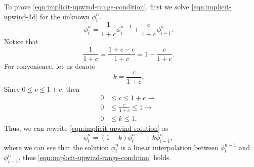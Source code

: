 \documentclass[../thesis.tex]{subfiles}
\begin{document}
To prove \eqref{eqn:implicit-upwind-range-condition}, first we solve \eqref{eqn:implicit-upwind-1d} for the unknown \(\phi_{i}^{n}\).
\begin{equation}\label{eqn:implicit-upwind-solution}
    \phi_{i}^{n} =
    \frac{1}{1+c}\phi_{i}^{n-1} + \frac{c}{1+c}\phi_{i-1}^{n}.
\end{equation}
Notice that
\[
    \frac{1}{1+c} = \frac{1+c-c}{1+c} = 1 - \frac{c}{1+c}.
\]
For convenience, let us denote
\begin{equation}\label{eqn:implicit-upwind-coefficient}
    k = \frac{c}{1+c}.
\end{equation}
Since \(0 \leq c \leq 1+c\), then
\begin{equation}
    \begin{split}
        0 &\leq c \leq 1+c \rightarrow\\
        0 &\leq \frac{c}{1+c} \leq 1 \rightarrow\\
        0 &\leq k \leq 1.
    \end{split}
\end{equation}
Thus, we can rewrite \eqref{eqn:implicit-upwind-solution} as
\begin{equation}\label{eqn:implicit-uwpind-linear-interpolation}
    \phi_{i}^{n} =
    (1-k)\phi_{i}^{n-1} + k\phi_{i-1}^{n},
\end{equation}
where we can see that the solution \(\phi_{i}^{n}\) is a linear interpolation
between \(\phi_{i}^{n-1}\) and \(\phi_{i-1}^{n}\), thus
\eqref{eqn:implicit-upwind-range-condition} holds.
\end{document}
